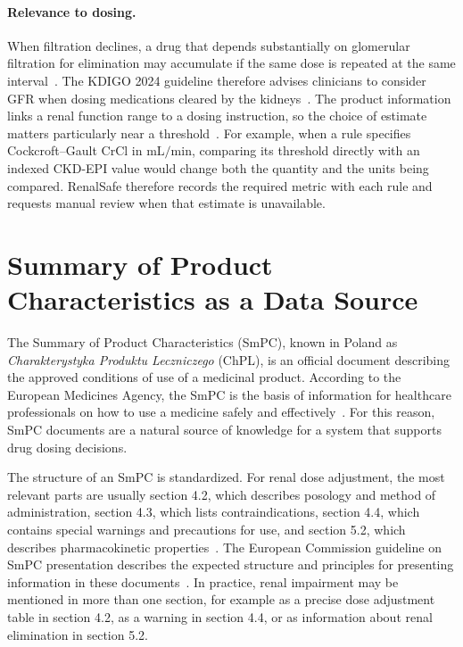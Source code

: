 \documentclass[12pt,a4paper,twoside]{book}
\begin{document}
\paragraph{Relevance to dosing.}
When filtration declines, a drug that depends substantially on glomerular filtration for elimination may accumulate if the same dose is repeated at the same interval~\cite{artDooguePolasek2011DrugDosingRenalDisease}.
The KDIGO 2024 guideline therefore advises clinicians to consider GFR when dosing medications cleared by the kidneys~\cite{artKDIGO2024CKD}.
The product information links a renal function range to a dosing instruction, so the choice of estimate matters particularly near a threshold~\cite{artStevens2009DrugDosingRecommendations,artHudsonNolin2018KidneyFunctionDrugDosing,artDooguePolasek2011DrugDosingRenalDisease}.
For example, when a rule specifies Cockcroft--Gault CrCl in \(\mathrm{mL/min}\), comparing its threshold directly with an indexed CKD-EPI value would change both the quantity and the units being compared.
RenalSafe therefore records the required metric with each rule and requests manual review when that estimate is unavailable.

\section{Summary of Product Characteristics as a Data Source}
\label{sec:smpc-data-source}

The Summary of Product Characteristics (SmPC), known in Poland as \textit{Charakterystyka Produktu Leczniczego} (ChPL), is an official document describing the approved conditions of use of a medicinal product. 
According to the European Medicines Agency, the SmPC is the basis of information for healthcare professionals on how to use a medicine safely and effectively~\cite{miscEMASmPC}. 
For this reason, SmPC documents are a natural source of knowledge for a system that supports drug dosing decisions.

The structure of an SmPC is standardized. 
For renal dose adjustment, the most relevant parts are usually section 4.2, which describes posology and method of administration, section 4.3, which lists contraindications, section 4.4, which contains special warnings and precautions for use, and section 5.2, which describes pharmacokinetic properties~\cite{miscEuropeanCommissionSmPCGuideline}.
The European Commission guideline on SmPC presentation describes the expected structure and principles for presenting information in these documents~\cite{miscEuropeanCommissionSmPCGuideline}. 
In practice, renal impairment may be mentioned in more than one section, for example as a precise dose adjustment table in section 4.2, as a warning in section 4.4, or as information about renal elimination in section 5.2.
\end{document}
